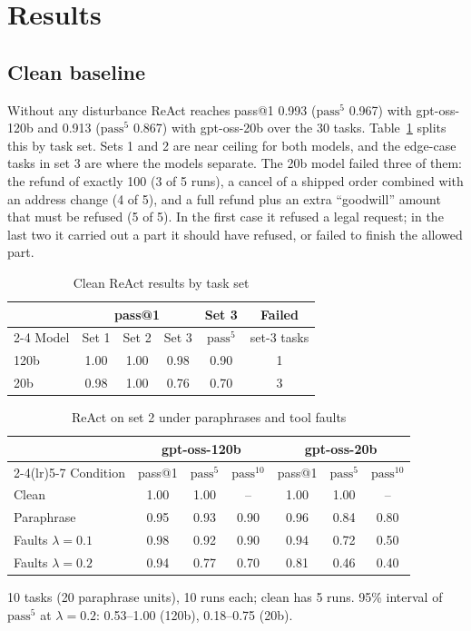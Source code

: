 \documentclass[10pt,a4paper,twocolumn]{article}
\newcommand{\passk}[1]{\mathrm{pass}^{#1}}
\begin{document}
\section{Results}
\subsection{Clean baseline}
Without any disturbance ReAct reaches pass@1 0.993 ($\passk{5}$ 0.967) with gpt-oss-120b and 0.913 ($\passk{5}$ 0.867)
with gpt-oss-20b over the 30 tasks. Table~\ref{tab:sets} splits this by task set. Sets 1 and 2 are near ceiling for both
models, and the edge-case tasks in set 3 are where the models separate. The 20b model failed three of them: the refund
of exactly 100 (3 of 5 runs), a cancel of a shipped order combined with an address change (4 of 5), and a full refund
plus an extra ``goodwill'' amount that must be refused (5 of 5). In the first case it refused a legal request; in the
last two it carried out a part it should have refused, or failed to finish the allowed part.

\begin{table}[t]
\caption{Clean ReAct results by task set}\label{tab:sets}
\centering\small
\begin{tabular}{@{}lccccc@{}}
\toprule
 & \multicolumn{3}{c}{pass@1} & Set 3 & Failed\\
\cmidrule(lr){2-4}
Model & Set 1 & Set 2 & Set 3 & $\passk{5}$ & set-3 tasks\\
\midrule
120b & 1.00 & 1.00 & 0.98 & 0.90 & 1\\
20b & 0.98 & 1.00 & 0.76 & 0.70 & 3\\
\bottomrule
\end{tabular}
\end{table}

\begin{table}[t]
\caption{ReAct on set 2 under paraphrases and tool faults}\label{tab:stress}
\centering\small
\setlength{\tabcolsep}{4pt}
\begin{tabular}{@{}lcccccc@{}}
\toprule
 & \multicolumn{3}{c}{gpt-oss-120b} & \multicolumn{3}{c}{gpt-oss-20b}\\
\cmidrule(lr){2-4}\cmidrule(lr){5-7}
Condition & pass@1 & $\passk{5}$ & $\passk{10}$ & pass@1 & $\passk{5}$ & $\passk{10}$\\
\midrule
Clean & 1.00 & 1.00 & -- & 1.00 & 1.00 & --\\
Paraphrase & 0.95 & 0.93 & 0.90 & 0.96 & 0.84 & 0.80\\
Faults $\lambda=0.1$ & 0.98 & 0.92 & 0.90 & 0.94 & 0.72 & 0.50\\
Faults $\lambda=0.2$ & 0.94 & 0.77 & 0.70 & 0.81 & 0.46 & 0.40\\
\bottomrule
\end{tabular}

\smallskip
\footnotesize 10 tasks (20 paraphrase units), 10 runs each; clean has 5 runs. 95\% interval of $\passk{5}$ at
$\lambda=0.2$: 0.53--1.00 (120b), 0.18--0.75 (20b).
\end{table}
\end{document}
